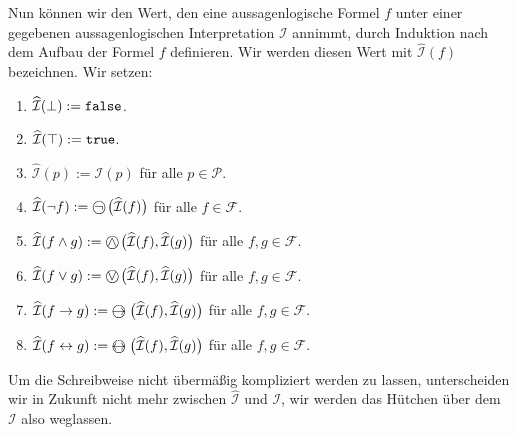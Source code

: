 \begin{table}[!ht]
  \centering
{}
  \caption{Interpretation der Junktoren.}
  \label{tab:aussagen-logik}
\end{table}
Nun k\"{o}nnen wir den Wert, den eine aussagenlogische Formel $f$ unter einer gegebenen
aussagenlogischen Interpretation $\mathcal{I}$ annimmt, durch Induktion nach dem Aufbau
der Formel $f$ definieren.  Wir werden diesen Wert mit $\widehat{\mathcal{I}}(f)$
bezeichnen.  Wir setzen:
\begin{enumerate}
\item $\widehat{\mathcal{I}}(\bot) := \texttt{false}$.
\item $\widehat{\mathcal{I}}(\top) := \texttt{true}$.
\item $\widehat{\mathcal{I}}(p) := \mathcal{I}(p)$ f\"{u}r alle $p \in \mathcal{P}$.
\item $\widehat{\mathcal{I}}(\neg f) := \circneg\;\bigl(\widehat{\mathcal{I}}(f)\bigr)$ f\"{u}r alle $f \in \mathcal{F}$.
\item $\widehat{\mathcal{I}}(f \wedge g) := \circwedge\;\bigl(\widehat{\mathcal{I}}(f), \widehat{\mathcal{I}}(g)\bigr)$ 
      f\"{u}r alle $f, g \in \mathcal{F}$.
\item $\widehat{\mathcal{I}}(f \vee g) := \circvee\;\bigl(\widehat{\mathcal{I}}(f), \widehat{\mathcal{I}}(g)\bigr)$ 
      f\"{u}r alle $f, g \in \mathcal{F}$.
\item $\widehat{\mathcal{I}}(f \rightarrow g) := \circright\;\bigl(\widehat{\mathcal{I}}(f), \widehat{\mathcal{I}}(g)\bigr)$ 
      f\"{u}r alle $f, g \in \mathcal{F}$.
\item $\widehat{\mathcal{I}}(f \leftrightarrow g) := \circleftright\;\bigl(\widehat{\mathcal{I}}(f), \widehat{\mathcal{I}}(g)\bigr)$ 
      f\"{u}r alle $f, g \in \mathcal{F}$.
\end{enumerate}
Um die Schreibweise nicht \"{u}berm\"{a}\ss{}ig kompliziert werden zu lassen, unterscheiden wir in
Zukunft nicht  mehr zwischen $\widehat{\mathcal{I}}$ und $\mathcal{I}$, wir werden das H\"{u}tchen \"{u}ber dem
$\mathcal{I}$ also weglassen.

